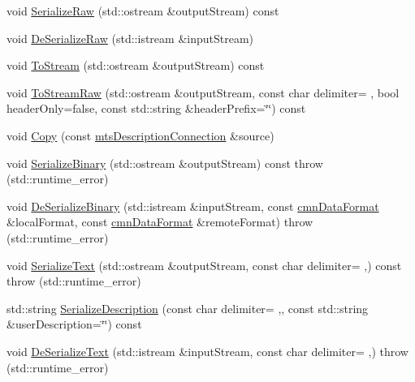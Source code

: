 \begin{DoxyCompactItemize}
\item 
void \hyperlink{classmts_description_connection_ab75805db6e073fe6f8366ac00710a602}{Serialize\+Raw} (std\+::ostream \&output\+Stream) const 
\item 
void \hyperlink{classmts_description_connection_a8c4d514255418b84007f2bc8a288e6a4}{De\+Serialize\+Raw} (std\+::istream \&input\+Stream)
\item 
void \hyperlink{classmts_description_connection_ae0a1b543582b4fd912aeb2a1ce47ace4}{To\+Stream} (std\+::ostream \&output\+Stream) const 
\item 
void \hyperlink{classmts_description_connection_a0dca0e7c66aff48c9192e5c979a489ec}{To\+Stream\+Raw} (std\+::ostream \&output\+Stream, const char delimiter= \textquotesingle{} \textquotesingle{}, bool header\+Only=false, const std\+::string \&header\+Prefix=\char`\"{}\char`\"{}) const 
\item 
void \hyperlink{classmts_description_connection_a455e13e6e18c7475423d40059d07cc19}{Copy} (const \hyperlink{classmts_description_connection}{mts\+Description\+Connection} \&source)
\item 
void \hyperlink{classmts_description_connection_ae33f622506c0b93738b30003cf5525d7}{Serialize\+Binary} (std\+::ostream \&output\+Stream) const   throw (std\+::runtime\+\_\+error)
\item 
void \hyperlink{classmts_description_connection_a1cb5809592504df7a8bdae4fc4da6b59}{De\+Serialize\+Binary} (std\+::istream \&input\+Stream, const \hyperlink{classcmn_data_format}{cmn\+Data\+Format} \&local\+Format, const \hyperlink{classcmn_data_format}{cmn\+Data\+Format} \&remote\+Format)  throw (std\+::runtime\+\_\+error)
\item 
void \hyperlink{classmts_description_connection_a557a83997e0896d5e30c077b3378b10b}{Serialize\+Text} (std\+::ostream \&output\+Stream, const char delimiter= \textquotesingle{},\textquotesingle{}) const   throw (std\+::runtime\+\_\+error)
\item 
std\+::string \hyperlink{classmts_description_connection_aa49c013b25380ab8a7bce24b64f9b22f}{Serialize\+Description} (const char delimiter= \textquotesingle{},\textquotesingle{}, const std\+::string \&user\+Description=\char`\"{}\char`\"{}) const 
\item 
void \hyperlink{classmts_description_connection_a247b6cc35a441df47843c3da74aaaa1a}{De\+Serialize\+Text} (std\+::istream \&input\+Stream, const char delimiter= \textquotesingle{},\textquotesingle{})  throw (std\+::runtime\+\_\+error)
\item 

\end{DoxyCompactItemize}
